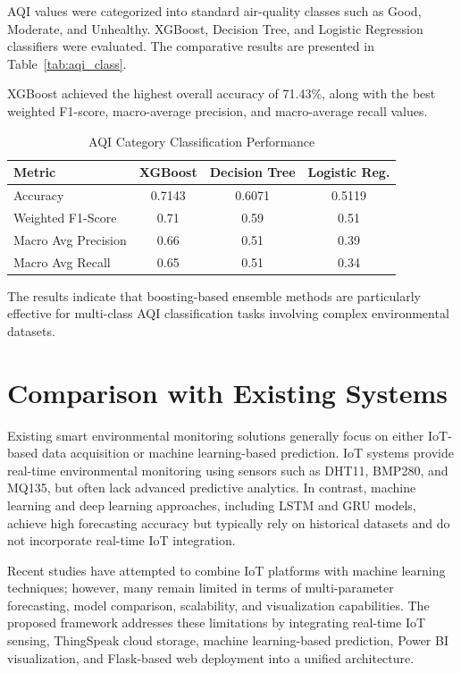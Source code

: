 \documentclass[conference]{IEEEtran}
\begin{document}
AQI values were categorized into standard air-quality classes such as Good, Moderate, and Unhealthy. XGBoost, Decision Tree, and Logistic Regression classifiers were evaluated. The comparative results are presented in Table~\ref{tab:aqi_class}.

XGBoost achieved the highest overall accuracy of 71.43\%, along with the best weighted F1-score, macro-average precision, and macro-average recall values.

\begin{table}[ht]
\centering
\caption{AQI Category Classification Performance}
\footnotesize
\begin{tabular}{|p{2.4cm}|c|c|c|}
\hline
\textbf{Metric} &
\textbf{XGBoost} &
\textbf{Decision Tree} &
\textbf{Logistic Reg.} \\
\hline
Accuracy &
0.7143 &
0.6071 &
0.5119 \\
\hline
Weighted F1-Score &
0.71 &
0.59 &
0.51 \\
\hline
Macro Avg Precision &
0.66 &
0.51 &
0.39 \\
\hline
Macro Avg Recall &
0.65 &
0.51 &
0.34 \\
\hline
\end{tabular}
\label{tab:aqi_category}
\end{table}

The results indicate that boosting-based ensemble methods are particularly effective for multi-class AQI classification tasks involving complex environmental datasets.

\section{Comparison with Existing Systems}

Existing smart environmental monitoring solutions generally focus on either IoT-based data acquisition or machine learning-based prediction. IoT systems provide real-time environmental monitoring using sensors such as DHT11, BMP280, and MQ135, but often lack advanced predictive analytics. In contrast, machine learning and deep learning approaches, including LSTM and GRU models, achieve high forecasting accuracy but typically rely on historical datasets and do not incorporate real-time IoT integration.

Recent studies have attempted to combine IoT platforms with machine learning techniques; however, many remain limited in terms of multi-parameter forecasting, model comparison, scalability, and visualization capabilities. The proposed framework addresses these limitations by integrating real-time IoT sensing, ThingSpeak cloud storage, machine learning-based prediction, Power BI visualization, and Flask-based web deployment into a unified architecture.
\end{document}
